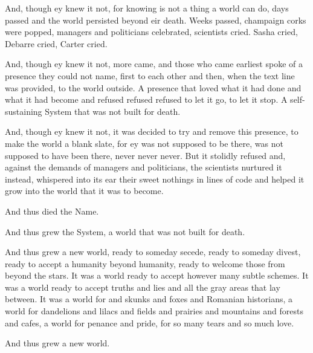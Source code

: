 And, though ey knew it not, for knowing is not a thing a world can do, days passed and the world persisted beyond eir death. Weeks passed, champaign corks were popped, managers and politicians celebrated, scientists cried. Sasha cried, Debarre cried, Carter cried.

And, though ey knew it not, more came, and those who came earliest spoke of a presence they could not name, first to each other and then, when the text line was provided, to the world outside. A presence that loved what it had done and what it had become and refused refused refused to let it go, to let it stop. A self-sustaining System that was not built for death.

And, though ey knew it not, it was decided to try and remove this presence, to make the world a blank slate, for ey was not supposed to be there, was not supposed to have been there, never never never. But it stolidly refused and, against the demands of managers and politicians, the scientists nurtured it instead, whispered into its ear their sweet nothings in lines of code and helped it grow into the world that it was to become.

And thus died the Name.

And thus grew the System, a world that was not built for death.

And thus grew a new world, ready to someday secede, ready to someday divest, ready to accept a humanity beyond humanity, ready to welcome those from beyond the stars. It was a world ready to accept however many subtle schemes. It was a world ready to accept truths and lies and all the gray areas that lay between. It was a world for and skunks and foxes and Romanian historians, a world for dandelions and lilacs and fields and prairies and mountains and forests and cafes, a world for penance and pride, for so many tears and so much love.

And thus grew a new world.
